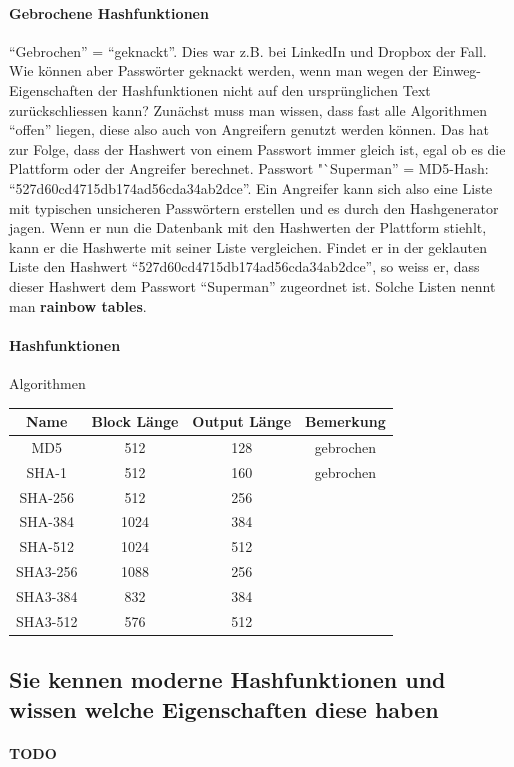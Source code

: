 \documentclass[10pt,a4paper]{article}
\begin{document}
\paragraph*{Gebrochene Hashfunktionen}"`Gebrochen"' = "`geknackt"'. Dies war z.B. bei LinkedIn und Dropbox der Fall. Wie können aber Passwörter geknackt werden, wenn man wegen der Einweg-Eigenschaften der Hashfunktionen nicht auf den ursprünglichen Text zurückschliessen kann?
Zunächst muss man wissen, dass fast alle Algorithmen "`offen"' liegen, diese also auch von Angreifern genutzt werden können. Das hat zur Folge, dass der Hashwert von einem Passwort immer gleich ist, egal ob es die Plattform oder der Angreifer berechnet.
Passwort "`Superman” = MD5-Hash: "`527d60cd4715db174ad56cda34ab2dce"'.
Ein Angreifer kann sich also eine Liste mit typischen unsicheren Passwörtern erstellen und es durch den Hashgenerator jagen. Wenn er nun die Datenbank mit den Hashwerten der Plattform stiehlt, kann er die Hashwerte mit seiner Liste vergleichen. Findet er in der geklauten Liste den Hashwert "`527d60cd4715db174ad56cda34ab2dce"', so weiss er, dass dieser Hashwert dem Passwort "`Superman"' zugeordnet ist. Solche Listen nennt man \textbf{rainbow tables}.

\paragraph*{Hashfunktionen}Algorithmen\newline %
\begin{tabular}{|c|c|c|c|}
    \hline
    Name&Block Länge&Output Länge&Bemerkung\\
    \hline
    MD5&512&128&gebrochen\\
    SHA-1&512&160&gebrochen\\
    SHA-256&512&256& \\
    SHA-384&1024&384& \\
    SHA-512&1024&512& \\
    SHA3-256&1088&256& \\
    SHA3-384&832&384& \\
    SHA3-512&576&512& \\
    \hline
\end{tabular}


\subsection*{Sie kennen moderne Hashfunktionen und wissen welche Eigenschaften diese haben}
\paragraph*{TODO}
\end{document}
